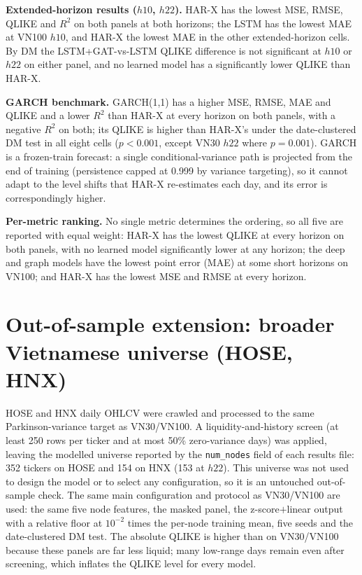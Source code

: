 \documentclass[runningheads]{llncs}
\begin{document}
\textbf{Extended-horizon results ($h10$, $h22$).} HAR-X has the lowest MSE, RMSE, QLIKE and $R^2$ on both
panels at both horizons; the LSTM has the lowest MAE at VN100 $h10$, and HAR-X the lowest MAE in the other
extended-horizon cells. By DM the LSTM+GAT-vs-LSTM QLIKE difference is not significant at $h10$ or $h22$ on
either panel, and no learned model has a significantly lower QLIKE than HAR-X.

\textbf{GARCH benchmark.} GARCH(1,1) has a higher MSE, RMSE, MAE and QLIKE and a lower $R^2$ than HAR-X at
every horizon on both panels, with a negative $R^2$ on both; its QLIKE is higher than HAR-X's under the
date-clustered DM test in all eight cells ($p<0.001$, except VN30 $h22$ where $p=0.001$). GARCH is a frozen-train forecast: a single conditional-variance path is projected from the end of training (persistence capped at 0.999 by variance targeting), so it cannot adapt to the level shifts that HAR-X re-estimates each day, and its error is correspondingly higher.

\textbf{Per-metric ranking.} No single metric determines the ordering, so all five are reported with equal
weight: HAR-X has the lowest QLIKE at every horizon on both panels, with no learned model significantly lower
at any horizon; the deep and graph models have the lowest point error (MAE) at some short horizons on VN100;
and HAR-X has the lowest MSE and RMSE at every horizon.

\section{Out-of-sample extension: broader Vietnamese universe (HOSE, HNX)}\label{sec:oos}
HOSE and HNX daily OHLCV were crawled and processed to the same Parkinson-variance target as VN30/VN100. A
liquidity-and-history screen (at least 250 rows per ticker and at most 50\% zero-variance days) was applied,
leaving the modelled universe reported by the \texttt{num\_nodes} field of each results file: 352 tickers on
HOSE and 154 on HNX (153 at $h22$). This universe was not used to design the model or to select any
configuration, so it is an untouched out-of-sample check. The same main configuration and protocol as
VN30/VN100 are used: the same five node features, the masked panel, the z-score$+$linear output with a
relative floor at $10^{-2}$ times the per-node training mean, five seeds and the date-clustered DM test. The
absolute QLIKE is higher than on VN30/VN100 because these panels are far less liquid; many low-range days
remain even after screening, which inflates the QLIKE level for every model.
\end{document}
